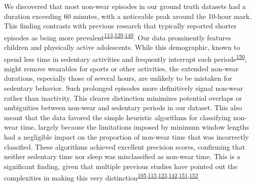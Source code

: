 \documentclass[
  10pt,
]{scrbook}
\begin{document}
We discovered that most non-wear episodes in our ground truth datasets
had a duration exceeding 60 minutes, with a noticeable peak around the
10-hour mark. This finding contrasts with previous research that
typically reported shorter episodes as being more
prevalent\textsuperscript{\protect\hyperlink{ref-aadland_comparison_2018}{113},\protect\hyperlink{ref-jaeschke_variability_2018}{129},\protect\hyperlink{ref-hutto_identifying_2013}{149}}.
Our data prominently features children and physically active
adolescents. While this demographic, known to spend less time in
sedentary activities and frequently interrupt such
periods\textsuperscript{\protect\hyperlink{ref-cooper_objectively_2015}{150}},
might remove wearables for sports or other activities, the extended
non-wear durations, especially those of several hours, are unlikely to
be mistaken for sedentary behavior. Such prolonged episodes more
definitively signal non-wear rather than inactivity. This clearer
distinction minimizes potential overlaps or ambiguities between non-wear
and sedentary periods in our dataset. This also meant that the data
favored the simple heuristic algorithms for classifying non-wear time,
largely because the limitations imposed by minimum window lengths had a
negligible impact on the proportion of non-wear time that was
incorrectly classified. These algorithms achieved excellent precision
scores, confirming that neither sedentary time nor sleep was
misclassified as non-wear time. This is a significant finding, given
that multiple previous studies have pointed out the complexities in
making this very
distinction\textsuperscript{\protect\hyperlink{ref-choi_validation_2011}{105},\protect\hyperlink{ref-duncan_wear-time_2018}{115},\protect\hyperlink{ref-doherty_large_2017}{123},\protect\hyperlink{ref-troiano_physical_2008}{142},\protect\hyperlink{ref-barouni_ambulatory_2020}{151},\protect\hyperlink{ref-mn_non-wear_2020}{152}}.
\end{document}
